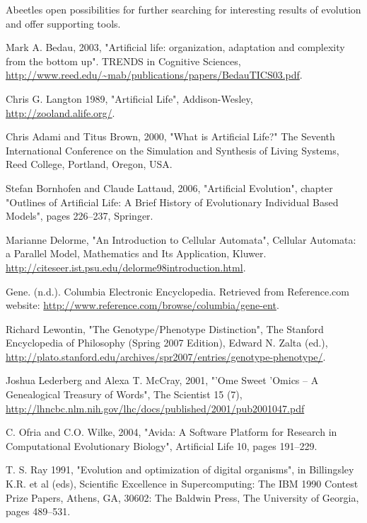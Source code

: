 \documentclass[a4paper,12pt]{report}
\begin{document}
\noindent Abeetles open possibilities for further searching for interesting results of evolution and offer supporting tools.


\begin{thebibliography}{99}

Mark A. Bedau, 2003, "Artificial life: organization, adaptation and complexity from the bottom up". TRENDS in Cognitive Sciences, \url{http://www.reed.edu/~mab/publications/papers/BedauTICS03.pdf}.

Chris G. Langton 1989,  "Artificial Life", Addison-Wesley, \url{http://zooland.alife.org/}.

Chris Adami and Titus Brown, 2000, "What is Artificial Life?" The Seventh International Conference on the Simulation and Synthesis of Living Systems, Reed College, Portland, Oregon, USA.

Stefan Bornhofen and Claude Lattaud, 2006, "Artificial Evolution", chapter "Outlines of Artificial Life: A Brief History of Evolutionary Individual Based Models", pages 226--237, Springer.

Marianne Delorme, "An Introduction to Cellular Automata", Cellular Automata: a Parallel Model, Mathematics and Its Application, Kluwer. \url{http://citeseer.ist.psu.edu/delorme98introduction.html}. 

Gene. (n.d.). Columbia Electronic Encyclopedia. Retrieved from Reference.com website: \url{http://www.reference.com/browse/columbia/gene-ent}.

Richard Lewontin, "The Genotype/Phenotype Distinction", The Stanford Encyclopedia of Philosophy (Spring 2007 Edition), Edward N. Zalta (ed.), \url{http://plato.stanford.edu/archives/spr2007/entries/genotype-phenotype/}.

Joshua Lederberg and Alexa T. McCray, 2001, "'Ome Sweet 'Omics -- A Genealogical Treasury of Words", The Scientist 15 (7), \url{http://lhncbc.nlm.nih.gov/lhc/docs/published/2001/pub2001047.pdf}

C. Ofria and C.O. Wilke, 2004, "Avida: A Software Platform for Research in Computational Evolutionary Biology", Artificial Life 10, pages 191--229.

T. S. Ray 1991, "Evolution and optimization of digital organisms", in Billingsley K.R. et al (eds), Scientific Excellence in Supercomputing: The IBM 1990 Contest Prize Papers, Athens, GA, 30602: The Baldwin Press, The University of Georgia, pages 489--531.


\end{thebibliography}
\end{document}
